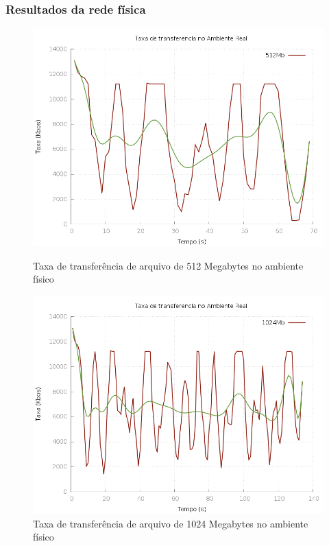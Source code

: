 \documentclass{beamer}
\begin{document}
\begin{frame}
    \frametitle{Resultados da rede física}

    \begin{figure}[ht]
        \centering
        \begin{minipage}[b]{0.49\linewidth}
            \centering
            \includegraphics[width=\textwidth]{data/data_cp_real/taxa_512}
            \caption{Taxa de transferência de arquivo de 512 Megabytes no ambiente físico}
            \label{fig:real512}
        \end{minipage}
        \begin{minipage}[b]{0.49\linewidth}
            \centering
            \includegraphics[width=\textwidth]{data/data_cp_real/taxa_1024}
            \caption{Taxa de transferência de arquivo de 1024 Megabytes no ambiente físico}
            \label{fig:real1024}
        \end{minipage}
    \end{figure}
\end{frame}
\end{document}
